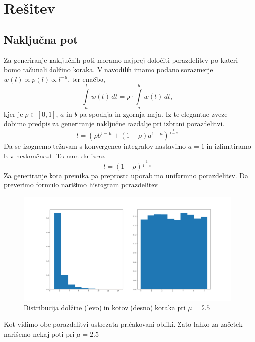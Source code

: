 \documentclass{article}
\begin{document}
\section{Rešitev}
\subsection{Naključna pot}
Za generiranje naključnih poti moramo najprej določiti porazdelitev po kateri bomo računali dolžino koraka. V navodilih imamo podano sorazmerje $w(l) \propto p(l) \propto l^{-\mu}$, ter enačbo,
\begin{equation*}
  \int\limits_{a}^{l} w(t)\,  dt = \rho \cdot \int\limits_{a}^{b}  w(t)\, dt,
\end{equation*}
kjer je $\rho \in [0, 1]$, $a$ in $b$ pa spodnja in zgornja meja. Iz te elegantne zveze dobimo predpis za generiranje naključne razdalje pri izbrani porazdelitvi. 
\begin{equation*}
    l = (\rho b^{1 - \mu} + (1 - \rho) a^{1 - \mu})^{\frac{1}{1 - \mu}}
\end{equation*}
Da se izognemo težavam s konvergenco integralov nastavimo $a=1$ in izlimitiramo b v neskončnost. To nam da izraz
\begin{equation*}
  l = (1 - \rho)^{\frac{1}{1 - \mu}}
\end{equation*}
Za generiranje kota premika pa preprosto uporabimo uniformno porazdelitev. Da preverimo formulo narišimo histogram porazdelitev
\begin{figure}[H]
  \centering
  \includegraphics[width=1\textwidth]{distribution.png} 
  \caption{Distribucija dolžine (levo) in kotov (desno) koraka pri $\mu = 2.5$}
\end{figure}
Kot vidimo obe porazdelitvi ustrezata pričakovani obliki. Zato lahko za začetek narišemo nekaj poti pri $\mu = 2.5$
\end{document}
